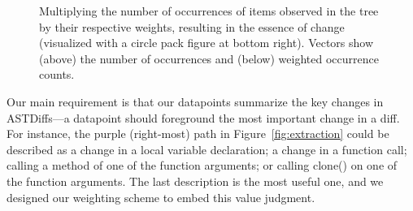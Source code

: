 \begin{figure}[h]
        

    \caption{\label{fig:essence}Multiplying the number of occurrences of items observed in the tree by their respective weights, resulting in the essence of change (visualized with a circle pack figure at bottom right). Vectors show (above) the number of occurrences and (below) weighted occurrence counts.}
\end{figure}

Our main requirement is that our datapoints summarize the key changes in ASTDiffs---a datapoint should foreground the most important change in a diff. For instance, the purple (right-most) path in Figure~\ref{fig:extraction} could be described as a change in a local variable declaration; a change in a function call; calling a method of one of the function arguments; or calling clone() on one of the function arguments. The last description is the most useful one, and we designed our weighting scheme to embed this value judgment.

